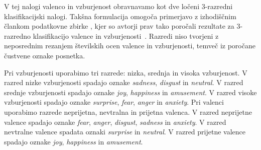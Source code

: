 V tej nalogi valenco in vzburjenost obravnavamo kot dve ločeni 3-razredni klasifikacijski nalogi.
Takšna formulacija omogoča primerjavo z izhodiščnim člankom podatkovne zbirke \MAHNOB{}, kjer so avtorji prav tako poročali rezultate za 3-razredno klasifikacijo valence in vzburjenosti~\cite{soleymani2012mahnob}.
Razredi niso tvorjeni z neposrednim rezanjem številskih ocen valence in vzburjenosti, temveč iz poročane čustvene oznake posnetka.

Pri vzburjenosti uporabimo tri razrede: nizka, srednja in visoka vzburjenost.
V razred nizke vzburjenosti spadajo oznake \emph{sadness}, \emph{disgust} in \emph{neutral}.
V razred srednje vzburjenosti spadajo oznake \emph{joy}, \emph{happiness} in \emph{amusement}.
V razred visoke vzburjenosti spadajo oznake \emph{surprise}, \emph{fear}, \emph{anger} in \emph{anxiety}.
Pri valenci uporabimo razrede neprijetna, nevtralna in prijetna valenca.
V razred neprijetne valence spadajo oznake \emph{fear}, \emph{anger}, \emph{disgust}, \emph{sadness} in \emph{anxiety}.
V razred nevtralne valence spadata oznaki \emph{surprise} in \emph{neutral}.
V razred prijetne valence spadajo oznake \emph{joy}, \emph{happiness} in \emph{amusement}.
